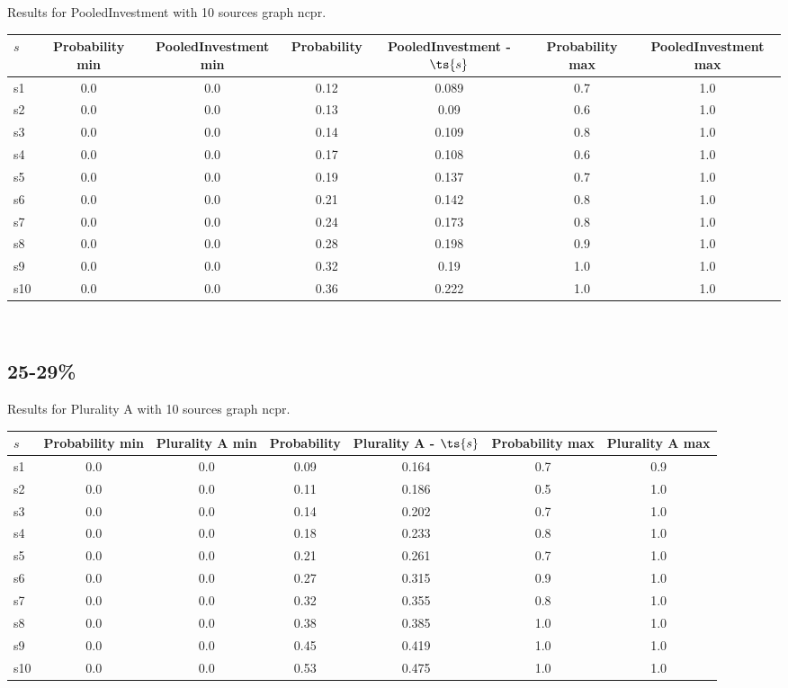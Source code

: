 \documentclass{article}
\begin{document}
\noindent Results for PooledInvestment with 10 sources graph ncpr.

\noindent\begin{tabular}{|l|c|c|c|c|c|c|}
\hline
$s$& Probability min & PooledInvestment min & Probability & PooledInvestment - $\ts{s}$ & Probability max & PooledInvestment max\\
\hline
s1 &0.0 & 0.0 & 0.12 & 0.089 & 0.7 & 1.0\\
\hline
s2 &0.0 & 0.0 & 0.13 & 0.09 & 0.6 & 1.0\\
\hline
s3 &0.0 & 0.0 & 0.14 & 0.109 & 0.8 & 1.0\\
\hline
s4 &0.0 & 0.0 & 0.17 & 0.108 & 0.6 & 1.0\\
\hline
s5 &0.0 & 0.0 & 0.19 & 0.137 & 0.7 & 1.0\\
\hline
s6 &0.0 & 0.0 & 0.21 & 0.142 & 0.8 & 1.0\\
\hline
s7 &0.0 & 0.0 & 0.24 & 0.173 & 0.8 & 1.0\\
\hline
s8 &0.0 & 0.0 & 0.28 & 0.198 & 0.9 & 1.0\\
\hline
s9 &0.0 & 0.0 & 0.32 & 0.19 & 1.0 & 1.0\\
\hline
s10 &0.0 & 0.0 & 0.36 & 0.222 & 1.0 & 1.0\\
\hline
\end{tabular}\\

\newpage

\subsection{25-29\%}

\noindent Results for Plurality A with 10 sources graph ncpr.

\noindent\begin{tabular}{|l|c|c|c|c|c|c|}
\hline
$s$& Probability min & Plurality A min & Probability & Plurality A - $\ts{s}$ & Probability max & Plurality A max\\
\hline
s1 &0.0 & 0.0 & 0.09 & 0.164 & 0.7 & 0.9\\
\hline
s2 &0.0 & 0.0 & 0.11 & 0.186 & 0.5 & 1.0\\
\hline
s3 &0.0 & 0.0 & 0.14 & 0.202 & 0.7 & 1.0\\
\hline
s4 &0.0 & 0.0 & 0.18 & 0.233 & 0.8 & 1.0\\
\hline
s5 &0.0 & 0.0 & 0.21 & 0.261 & 0.7 & 1.0\\
\hline
s6 &0.0 & 0.0 & 0.27 & 0.315 & 0.9 & 1.0\\
\hline
s7 &0.0 & 0.0 & 0.32 & 0.355 & 0.8 & 1.0\\
\hline
s8 &0.0 & 0.0 & 0.38 & 0.385 & 1.0 & 1.0\\
\hline
s9 &0.0 & 0.0 & 0.45 & 0.419 & 1.0 & 1.0\\
\hline
s10 &0.0 & 0.0 & 0.53 & 0.475 & 1.0 & 1.0\\
\hline
\end{tabular}\\
\end{document}
